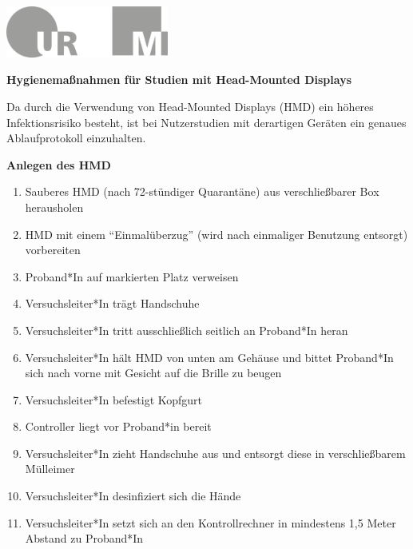 \documentclass[24pt, a4paper, portrait]{article}
\begin{document}
\pagestyle{empty}

\raggedleft

\includegraphics[width=0.4\textwidth]{logo}

\vspace{1cm}
\sffamily
\centering
\huge

\textbf{Hygienemaßnahmen für Studien mit Head-Mounted Displays}

\vspace{1cm}

\raggedright
\Large

Da durch die Verwendung von Head-Mounted Displays (HMD) ein höheres Infektionsrisiko besteht, ist bei Nutzerstudien mit derartigen Geräten ein genaues Ablaufprotokoll einzuhalten.

\vspace{0.5cm}

\textbf{Anlegen des HMD}

\large

\begin{enumerate}
    \item Sauberes HMD (nach 72-stündiger Quarantäne) aus verschließbarer Box herausholen
    \item HMD mit einem “Einmalüberzug” (wird nach einmaliger Benutzung entsorgt) vorbereiten
    \item Proband*In auf markierten Platz verweisen 
    \item Versuchsleiter*In trägt Handschuhe
    \item Versuchsleiter*In tritt ausschließlich seitlich an Proband*In heran
    \item Versuchsleiter*In hält HMD von unten am Gehäuse und bittet Proband*In sich nach vorne mit Gesicht auf die Brille zu beugen 
    \item Versuchsleiter*In befestigt Kopfgurt 
    \item Controller liegt vor Proband*in bereit 
    \item Versuchsleiter*In zieht Handschuhe aus und entsorgt diese in verschließbarem Mülleimer
    \item Versuchsleiter*In desinfiziert sich die Hände
    \item Versuchsleiter*In setzt sich an den Kontrollrechner in mindestens 1,5 Meter Abstand zu Proband*In
\end{enumerate}
\end{document}
